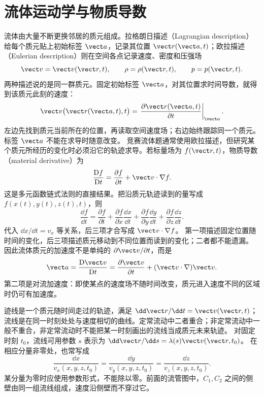 
\section{流体运动学与物质导数}\label{ch13:sec:material}

流体由大量不断更换邻居的质元组成。拉格朗日描述（Lagrangian description）给每个质元贴上初始标签 $\vect a$，记录其位置 $\vect r(\vect a,t)$；欧拉描述（Eulerian description）则在空间各点记录速度、密度和压强场
\begin{equation}
 \vect v=\vect v(\vect r,t),\qquad \rho=\rho(\vect r,t),\qquad p=p(\vect r,t).
\end{equation}
两种描述说的是同一群质元。固定初始标签 $\vect a$，对其位置求时间导数，就得到该质元此刻的速度：
\[
 \vect v\bigl(\vect r(\vect a,t),t\bigr)
 =\left.\frac{\partial\vect r(\vect a,t)}{\partial t}\right|_{\vect a}.
\]
左边先找到质元当前所在的位置，再读取空间速度场；右边始终跟踪同一个质元。标签 $\vect a$ 不能在求导时随意改变。
竞赛流体题通常使用欧拉描述，但研究某个质元所经历的变化时必须沿它的轨迹求导。若标量场为 $f(\vect r,t)$，物质导数（material derivative）为
\begin{equation}
 \frac{\mathrm D f}{\mathrm Dt}
 =\frac{\partial f}{\partial t}+\vect v\cdot\nabla f.
\end{equation}
这是多元函数链式法则的直接结果。把沿质元轨迹读到的量写成
$f(x(t),y(t),z(t),t)$，则
\[
 \frac{\dd f}{\dd t}=\frac{\partial f}{\partial t}
 +\frac{\partial f}{\partial x}\frac{\dd x}{\dd t}
 +\frac{\partial f}{\partial y}\frac{\dd y}{\dd t}
 +\frac{\partial f}{\partial z}\frac{\dd z}{\dd t}.
\]
代入 $\dd x/\dd t=v_x$ 等关系，后三项才合写成 $\vect v\cdot\nabla f$。
第一项描述固定位置随时间的变化，后三项描述质元移动到不同位置而读到的变化；二者都不能遗漏。
因此流体质元的加速度不是单纯的 $\partial\vect v/\partial t$，而是
\begin{equation}
 \vect a=\frac{\mathrm D\vect v}{\mathrm Dt}
 =\frac{\partial\vect v}{\partial t}+(\vect v\cdot\nabla)\vect v.
\end{equation}
第二项是对流加速度：即使某点的速度场不随时间改变，质元进入速度不同的区域时仍可有加速度。

迹线是一个质元随时间走过的轨迹，满足 $\dd\vect r/\dd t=\vect v(\vect r,t)$；流线是在同一时刻处处与速度相切的曲线。定常流动中二者重合；非定常流动中一般不重合，非定常流动时不能把某一时刻画出的流线当成质元未来轨迹。
对固定时刻 $t_0$，流线可用参数 $s$ 表示为 $\dd\vect r/\dd s=\lambda(s)\vect v(\vect r,t_0)$。
在相应分量非零处，也常写成
\[
 \frac{\dd x}{v_x(x,y,z,t_0)}=\frac{\dd y}{v_y(x,y,z,t_0)}
 =\frac{\dd z}{v_z(x,y,z,t_0)}.
\]
某分量为零时应使用参数形式，不能除以零。前面的流管图中，$C_1,C_2$ 之间的侧壁由同一组流线组成，速度沿侧壁而不穿过它。

